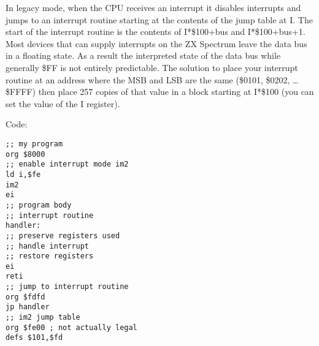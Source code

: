 In legacy mode, when the CPU receives an interrupt it disables
interrupts and jumps to an interrupt routine starting at the contents
of the jump table at I. The start of the interrupt routine is the
contents of I*\$100+bus and I*\$100+bus+1. Most devices that can
supply interrupts on the ZX Spectrum leave the data bus in a floating
state.  As a result the interpreted state of the data bus while
generally \$FF is not entirely predictable.  The solution to place
your interrupt routine at an address where the MSB and LSB are the
same (\$0101, \$0202, … \$FFFF) then place 257 copies of that value in
a block starting at I*\$100 (you can set the value of the I register).

Code:
\begin{verbatim}
;; my program
org $8000
;; enable interrupt mode im2
ld i,$fe
im2
ei
;; program body
;; interrupt routine
handler:
;; preserve registers used
;; handle interrupt
;; restore registers
ei
reti
;; jump to interrupt routine
org $fdfd
jp handler
;; im2 jump table
org $fe00 ; not actually legal
defs $101,$fd
\end{verbatim}


